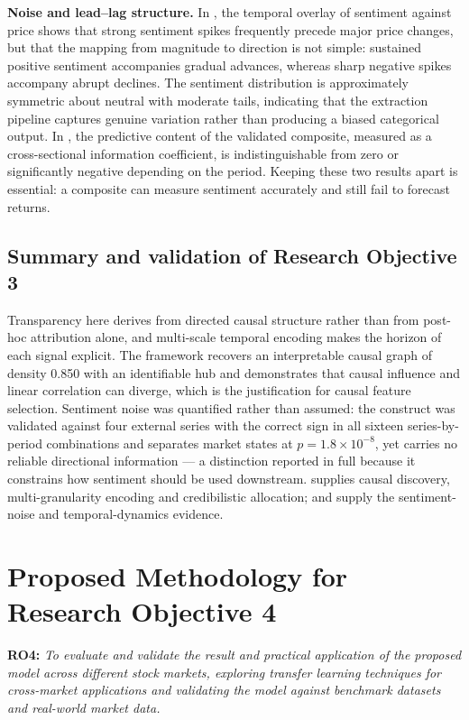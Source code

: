 \textbf{Noise and lead--lag structure.} In , the temporal overlay of sentiment
against price shows that strong sentiment spikes frequently precede major price changes, but
that the mapping from magnitude to direction is not simple: sustained positive sentiment
accompanies gradual advances, whereas sharp negative spikes accompany abrupt declines. The
sentiment distribution is approximately symmetric about neutral with moderate tails, indicating
that the extraction pipeline captures genuine variation rather than producing a biased
categorical output. In , the predictive content of the validated composite, measured
as a cross-sectional information coefficient, is indistinguishable from zero or significantly
negative depending on the period. Keeping these two results apart is essential: a composite can
measure sentiment accurately and still fail to forecast returns.

\subsection{Summary and validation of Research Objective 3}

Transparency here derives from directed causal structure rather than from post-hoc attribution
alone, and multi-scale temporal encoding makes the horizon of each signal explicit. The
framework recovers an interpretable causal graph of density 0.850 with an identifiable hub and
demonstrates that causal influence and linear correlation can diverge, which is the
justification for causal feature selection. Sentiment noise was quantified rather than assumed:
the construct was validated against four external series with the correct sign in all sixteen
series-by-period combinations and separates market states at $p = 1.8 \times 10^{-8}$, yet
carries no reliable directional information --- a distinction reported in full because it
constrains how sentiment should be used downstream.  supplies causal discovery,
multi-granularity encoding and credibilistic allocation;  and  supply
the sentiment-noise and temporal-dynamics evidence.

\section{Proposed Methodology for Research Objective 4}

\textbf{RO4:} \emph{To evaluate and validate the result and practical application of the
proposed model across different stock markets, exploring transfer learning techniques for
cross-market applications and validating the model against benchmark datasets and real-world
market data.}

